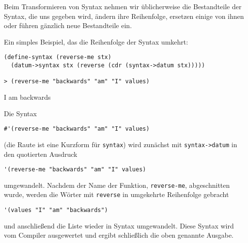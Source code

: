 Beim Transformieren von Syntax nehmen wir üblicherweise die Bestandteile der Syntax, die uns gegeben wird, ändern ihre Reihenfolge, ersetzen einige von ihnen oder führen gänzlich neue Bestandteile ein.

Ein simples Beispiel, das die Reihenfolge der Syntax umkehrt:

\begin{lstlisting}
(define-syntax (reverse-me stx)
  (datum->syntax stx (reverse (cdr (syntax->datum stx)))))
  
> (reverse-me "backwards" "am" "I" values)
\end{lstlisting}
{\routput {\qq}I{\qq} {\qq}am{\qq} {\qq}backwards{\qq}}

Die Syntax

\begin{lstlisting}
#'(reverse-me "backwards" "am" "I" values)
\end{lstlisting}

(die Raute ist eine Kurzform für \texttt{syntax}) wird zunächst mit \texttt{syntax->datum} in den quotierten Ausdruck 

\begin{lstlisting}
'(reverse-me "backwards" "am" "I" values)
\end{lstlisting}


umgewandelt. Nachdem der Name der Funktion, \texttt{reverse-me}, abgeschnitten wurde, werden die Wörter mit \texttt{reverse} in umgekehrte Reihenfolge gebracht

\begin{lstlisting}
'(values "I" "am" "backwards")
\end{lstlisting}

und anschließend die Liste wieder in Syntax umgewandelt. Diese Syntax wird vom Compiler ausgewertet und ergibt schließlich die oben genannte Ausgabe.


